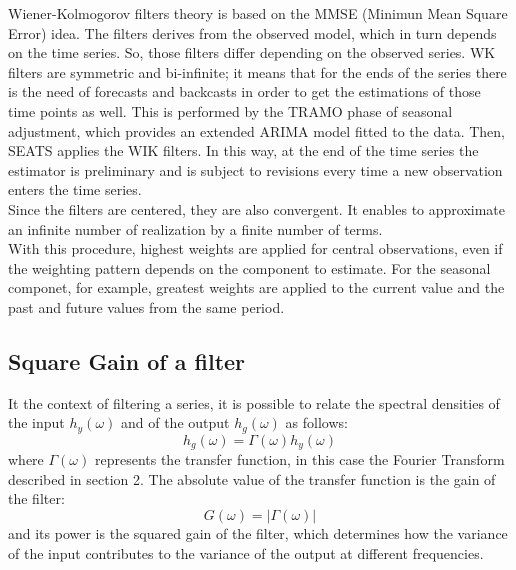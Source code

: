 \documentclass{article}
\begin{document}
Wiener-Kolmogorov filters theory is based on the MMSE (Minimun Mean Square Error) idea. The filters derives from the observed model, which in turn depends on the time series. So, those filters differ depending on the observed series. WK filters are symmetric and bi-infinite; it means that for the ends of the series there is the need of forecasts and backcasts in order to get the estimations of those time points as well. This is performed by the TRAMO phase of seasonal adjustment, which provides an extended ARIMA model fitted to the data. Then, SEATS applies the WIK filters.  In this way, at the end of the time series the estimator is preliminary and is subject to revisions every time a new observation enters the time series.\\ Since the filters are centered, they are also convergent. It enables to approximate an infinite number of realization by a finite number of terms.\\With this procedure, highest weights are applied for central observations, even if the weighting pattern depends on the component to estimate. For the seasonal componet, for example, greatest weights are applied to the current value and the past and future values from the same period.
\subsection*{Square Gain of a filter}
It the context of filtering a series, it is possible to relate the spectral densities of the input $h_{y}(\omega)$ and of the output $h_{g}(\omega)$ as follows:
\begin{equation*}
h_{g}(\omega)=\Gamma(\omega) h_{y}(\omega)
\end{equation*}
where $\Gamma(\omega)$ represents the transfer function, in this case the Fourier Transform described in section 2. The absolute value of the transfer function is the gain of the filter:
\begin{equation*}
G(\omega)=|\Gamma(\omega)|
\end{equation*} 
and its power is the squared gain of the filter, which determines how the variance of the input contributes to the variance of the output at different frequencies.



 
\end{document}
